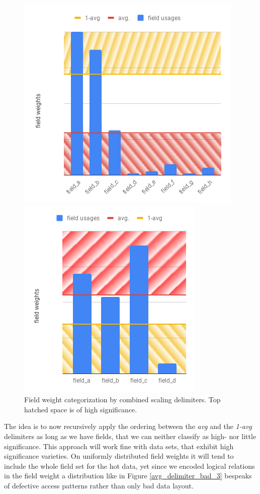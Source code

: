 \begin{figure}[!ht]
	\begin{minipage}[b]{0.5\linewidth}
		\centering
		\includegraphics[width=\textwidth,height=.7\textwidth]{PICs/delimiter_tiers}	
	\end{minipage}
	\hspace{0.5cm}
	\begin{minipage}[b]{0.5\linewidth}
		\centering
		\includegraphics[width=\textwidth,height=.7\textwidth]{PICs/delimiter_tiers_2}
	\end{minipage}
	\caption{Field weight categorization by combined scaling delimiters. Top hatched space is of high significance.}\label{delimiter_tiers}
\end{figure}
The idea is to now recursively apply the ordering between the \textit{avg} and the \textit{1-avg} delimiters as long as we have fields, that we can neither classify as high- nor little significance. This approach will work fine with data sets, that exhibit high significance varieties. On uniformly distributed field weights it will tend to include the whole field set for the hot data, yet since we encoded logical relations in the field weight a distribution like in Figure \ref{avg_delimiter_bad_3} bespeaks of defective access patterns rather than only bad data layout.\\

